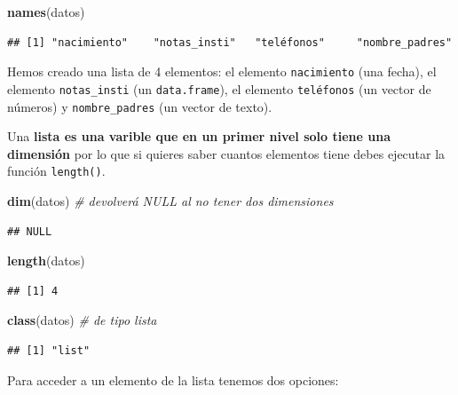 \documentclass[11pt,]{book}
\newenvironment{Shaded}{\begin{snugshade}}{\end{snugshade}}
\newcommand{\CommentTok}[1]{\textcolor[rgb]{0.37,0.37,0.37}{\textit{#1}}}
\newcommand{\KeywordTok}[1]{\textcolor[rgb]{0.27,0.27,0.27}{\textbf{#1}}}
\newcommand{\NormalTok}[1]{#1}
\begin{document}
\begin{Shaded}
\begin{Highlighting}[]
\KeywordTok{names}\NormalTok{(datos)}
\end{Highlighting}
\end{Shaded}

\begin{verbatim}
## [1] "nacimiento"    "notas_insti"   "teléfonos"     "nombre_padres"
\end{verbatim}

Hemos creado una lista de 4 elementos: el elemento \texttt{nacimiento} (una fecha), el elemento \texttt{notas\_insti} (un \texttt{data.frame}), el elemento \texttt{teléfonos} (un vector de números) y \texttt{nombre\_padres} (un vector de texto).

Una \textbf{lista es una varible que en un primer nivel solo tiene una dimensión} por lo que si quieres saber cuantos elementos tiene debes ejecutar la función \texttt{length()}.

\begin{Shaded}
\begin{Highlighting}[]
\KeywordTok{dim}\NormalTok{(datos) }\CommentTok{# devolverá NULL al no tener dos dimensiones}
\end{Highlighting}
\end{Shaded}

\begin{verbatim}
## NULL
\end{verbatim}

\begin{Shaded}
\begin{Highlighting}[]
\KeywordTok{length}\NormalTok{(datos)}
\end{Highlighting}
\end{Shaded}

\begin{verbatim}
## [1] 4
\end{verbatim}

\begin{Shaded}
\begin{Highlighting}[]
\KeywordTok{class}\NormalTok{(datos) }\CommentTok{# de tipo lista}
\end{Highlighting}
\end{Shaded}

\begin{verbatim}
## [1] "list"
\end{verbatim}

Para acceder a un elemento de la lista tenemos dos opciones:
\end{document}
